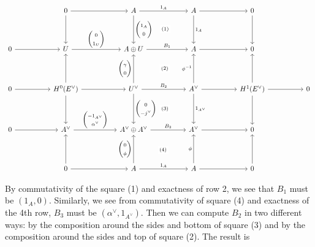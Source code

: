 \documentclass{amsart}
\theoremstyle{definition}
\begin{document}
\begin{equation*}
\begin{tikzcd}[column sep=5em,row sep=4em]
& 0
\arrow[r]
\arrow[d]
& A
\arrow[r,"1_{A}"]
\arrow[d,"\begin{pmatrix}1_{A}\\ 0   \end{pmatrix}"]
& A
\arrow[r]
\arrow[d,"1_{A}"]
& 0
\arrow[d]
& 
\\
0
\arrow[r]
& U
\arrow[r,"\begin{pmatrix}0\\ 1_{U}   \end{pmatrix} "]
& A\oplus U
\arrow[r,"B_{1}"]
\arrow[ur, phantom, "{\scriptstyle(1)}" description]
& A
\arrow[r]
& 0
& 
\\
0\arrow[r]
& H^{0}(E^{\vee})
\arrow[r]
\arrow[u]
\arrow[d]
& U^{\vee }
\arrow[ur, phantom, "{\scriptstyle(2)}" description]
\arrow[r,"B_{2}"]
\arrow[u,"\begin{pmatrix}\gamma \\ 0   \end{pmatrix}"]
\arrow[d,"\begin{pmatrix}0 \\ -j^{\vee }   \end{pmatrix}"]
& A^{\vee}
\arrow[r]
\arrow[u,"\phi^{-1}"]
\arrow[d,"1_{A^{\vee}}"]
& H^{1}(E^{\vee})
\arrow[r]
\arrow[u]
\arrow[d]
& 0
\\
0
\arrow[r]
& A^{\vee }
\arrow[r," \begin{pmatrix} -1_{A^{\vee}}\\ \alpha^{\vee }  \end{pmatrix}"]
& A^{\vee }\oplus A^{\vee }
\arrow[ur, phantom, "{\scriptstyle(3)}" description]
\arrow[r,"B_{3}"]
& A^{\vee }
\arrow[r]
& 0
&
\\
& 0
\arrow[r]
\arrow[u]
& A
\arrow[ur, phantom, "{\scriptstyle(4)}" description]
\arrow[r,"1_{A}"]
\arrow[u," \begin{pmatrix} 0\\ \phi   \end{pmatrix}"]
& A
\arrow[r]
\arrow[u,"\phi "]
& 0
\arrow[u]
&
\end{tikzcd}
\end{equation*}

By commutativity of the square (1) and exactness of row 2, we see that
$B_{1}$ must be $(1_{A},0)$. Similarly, we see from commutativity of
square (4) and exactness of the 4th row, $B_{3}$ must be
$(\alpha^{\vee},1_{A^{\vee}})$. Then we can compute $B_{2}$ in two
different ways: by the composition around the sides and bottom of
square (3) and by the composition around the sides and top of square
(2). The result is
\end{document}
